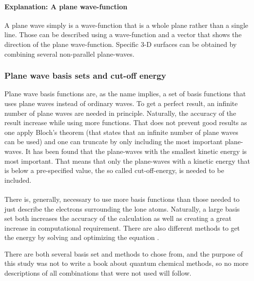 \documentclass[12pt,a4paper]{article}
\begin{document}
\paragraph{Explanation: A plane wave-function}
A plane wave simply is a wave-function that is a whole plane rather than a single line. Those can be described using a wave-function and a vector that shows the direction of the plane wave-function. Specific 3-D surfaces can be obtained by combining several non-parallel plane-waves. 

\subsubsection{Plane wave basis sets and cut-off energy}
Plane wave basis functions are, as the name implies, a set of basis functions that uses plane waves instead of ordinary waves. To get a perfect result, an infinite number of plane waves are needed in principle. Naturally, the accuracy of the result increase while using more functions. That does not prevent good results as one apply Bloch's theorem (that states that an infinite number of plane waves can be used) and one can truncate by only including the most important plane-waves. It has been found that the plane-waves with the smallest kinetic energy is most important. That means that only the plane-waves with a kinetic energy that is below a pre-specified value, the so called cut-off-energy, is needed to be included. 

\paragraph*{}
There is, generally, necessary to use more basis functions than those needed to just describe the electrons surrounding the lone atoms. Naturally, a large basis set both increases the accuracy of the calculation as well as creating a great increase in computational requirement.  There are also different methods to get the energy by solving and optimizing the equation \cite{computionalprimer}.

There are both several basis set and methods to chose from, and the purpose of this study was not to write a book about quantum chemical methods, so no more descriptions of all combinations that were not used will follow.



\printbibliography
\end{document}
